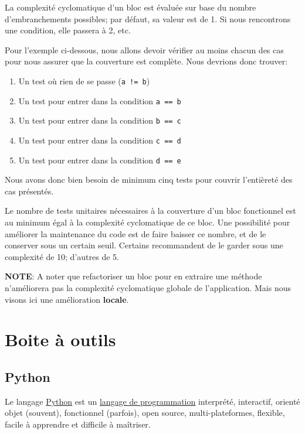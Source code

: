 \documentclass[11pt]{amsbook}
\newcommand{\admonition}[2]{\textbf{#1}: {#2}}
\begin{document}
La complexité cyclomatique d’un bloc est évaluée sur base du nombre d’embranchements possibles; par défaut, sa valeur est de 1.
Si nous rencontrons une condition, elle passera à 2, etc.


Pour l’exemple ci-dessous, nous allons devoir vérifier au moins chacun des cas pour nous assurer que la couverture est complète.
Nous devrions donc trouver:


\begin{enumerate}

\item{Un test où rien de se passe (\texttt{a != b})}

\item{Un test pour entrer dans la condition \texttt{a == b}}

\item{Un test pour entrer dans la condition \texttt{b == c}}

\item{Un test pour entrer dans la condition \texttt{c == d}}

\item{Un test pour entrer dans la condition \texttt{d == e}}

\end{enumerate}


Nous avons donc bien besoin de minimum cinq tests pour couvrir l’entièreté des cas présentés.


Le nombre de tests unitaires nécessaires à la couverture d’un bloc fonctionnel est au minimum égal à la complexité cyclomatique de ce bloc.
Une possibilité pour améliorer la maintenance du code est de faire baisser ce nombre, et de le conserver sous un certain seuil.
Certains recommandent de le garder sous une complexité de 10; d’autres de 5.


\admonition{NOTE}{A noter que refactoriser un bloc pour en extraire une méthode n’améliorera pas la complexité cyclomatique globale de l’application. Mais nous visons ici une amélioration \textbf{locale}.}
\hypertarget{x-boite-à-outils}{\chapter{Boite à outils}}
\hypertarget{x-python}{\section{Python}}
Le langage \href{https://www.python.org/}{Python} est un \href{https://docs.python.org/3/faq/general.html#what-is-python}{langage de programmation} interprété, interactif, orienté objet (souvent), fonctionnel (parfois), open source, multi-plateformes, flexible, facile à apprendre et difficile à maîtriser.
\end{document}
